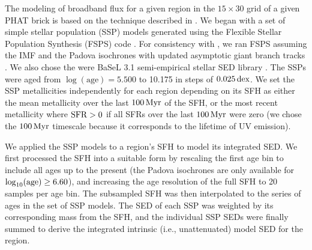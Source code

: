 \documentclass[iop, tighten]{emulateapj}
\begin{document}
The modeling of broadband flux for a given region in the $15 \times 30$ grid of
a given PHAT brick is based on the technique described in \citet{Johnson:2013}.
We began with a set of simple stellar population (SSP) models generated using
the Flexible Stellar Population Synthesis (FSPS) code \citep{Conroy:2009,
Conroy:2010}. For consistency with \citet{Lewis:2014}, we ran FSPS assuming the
\citet{Kroupa:2001} IMF and the Padova isochrones \citep{Marigo:2008} with
updated asymptotic giant branch tracks \citep{Girardi:2010}. We also chose the
were BaSeL 3.1 semi-empirical stellar SED library \citep{Westera:2002}. The
SSPs were aged from $\log(\mathrm{age})=5.500$ to 10.175 in steps of
$0.025\,\mathrm{dex}$. We set the SSP metallicities independently for each region
depending on its SFH as either the mean metallicity over the last $100\,\mathrm{Myr}$ of
the SFH, or the most recent metallicity where $\mathrm{SFR} > 0$ if all SFRs over the
last $100\,\mathrm{Myr}$ were zero (we chose the $100\,\mathrm{Myr}$ timescale because it
corresponds to the lifetime of UV emission).

We applied the SSP models to a region's SFH to model its integrated SED. We
first processed the SFH into a suitable form by rescaling the first age bin to
include all ages up to the present (the Padova isochrones are only available
for $\log_{10}(\mathrm{age}) \ge 6.60$), and increasing the age resolution of the
full SFH to 20 samples per age bin. The subsampled SFH was then interpolated to
the series of ages in the set of SSP models. The SED of each SSP was weighted
by its corresponding mass from the SFH, and the individual SSP SEDs were
finally summed to derive the integrated intrinsic (i.e., unattenuated) model
SED for the region.
\end{document}
